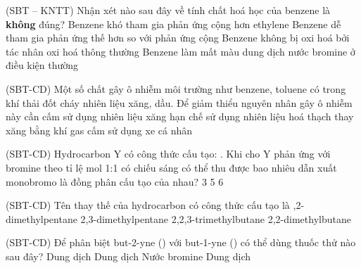 \documentclass[12pt,a4paper]{article}
\begin{document}
\begin{ex}
(SBT -- KNTT) Nhận xét nào sau đây về tính chất hoá học của benzene là \textbf{không} đúng?
\choice
{Benzene khó tham gia phản ứng cộng hơn ethylene}
{Benzene dễ tham gia phản ứng thế hơn so với phản ứng cộng}
{Benzene không bị oxi hoá bởi tác nhân oxi hoá thông thường}
{\True Benzene làm mất màu dung dịch nước bromine ở điều kiện thường}
\end{ex}

\begin{ex}
(SBT-CD) Một số chất gây ô nhiễm môi trường như benzene, toluene có trong khí thải đốt cháy nhiên liệu xăng, dầu. Để giảm thiểu nguyên nhân gây ô nhiễm này cần
\choice
{cấm sử dụng nhiên liệu xăng}
{\True hạn chế sử dụng nhiên liệu hoá thạch}
{thay xăng bằng khí gas}
{cấm sử dụng xe cá nhân}
\end{ex}

\begin{ex}
(SBT-CD) Hydrocarbon Y có công thức cấu tạo: . Khi cho Y phản ứng với bromine theo tỉ lệ mol 1:1 có chiếu sáng có thể thu được bao nhiêu dẫn xuất monobromo là đồng phân cấu tạo của nhau?
\choice
{3}
{}
{5}
{6}
\end{ex}

\begin{ex}
(SBT-CD) Tên thay thế của hydrocarbon có công thức cấu tạo  là
\choice
{,2-dimethylpentane}
{2,3-dimethylpentane}
{2,2,3-trimethylbutane}
{2,2-dimethylbutane}
\end{ex}

\begin{ex}
(SBT-CD) Để phân biệt but-2-yne () với but-1-yne () có thể dùng thuốc thử nào sau đây?
\choice
{Dung dịch }
{\True Dung dịch }
{Nước bromine}
{Dung dịch }
\end{ex}
\end{document}
